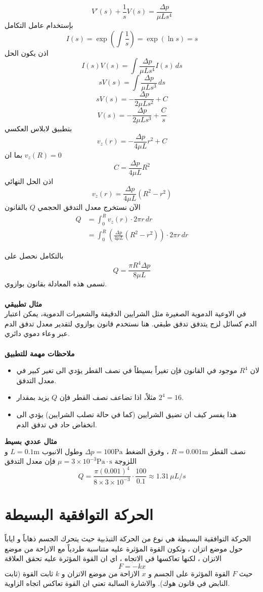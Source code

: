 \[
V'(s) + \frac{1}{s} V(s) = \frac{\Delta p}{\mu L s^4}
\]
بإستخدام عامل التكامل 
\[
I(s) = \exp\left(\int \frac{1}{s}\right) = \exp(\ln s) = s
\]
اذن يكون الحل
\[
I(s) V(s) = \int  \frac{\Delta p}{\mu L s^4} I(s)\, ds
\]
\[
s V(s) = \int \frac{\Delta p}{\mu L s^3} \, ds
\]
\[
s V(s) = -\frac{\Delta p}{2\mu L s^2} + C
\]
\[
V(s) = -\frac{\Delta p}{2\mu L s^3} + \frac{C}{s}
\]
بتطبيق لابلاس العكسي
\[
v_z(r) = - \frac{\Delta p}{4\mu L } r^2 + C
\]
بما ان $v_z(R) = 0 $
\[
C = \frac{\Delta p}{4\mu L } R^2
\]
اذن الحل النهائي
\[
v_z(r) = \frac{\Delta p}{4\mu L } (R^2 - r^2)
\]
الآن نستخرج معدل التدفق الحجمي $Q$ بالقانون
\begin{align*}
	Q &= \int_0^R v_z(r) \cdot 2\pi r \, dr\\
	&= \int_{0}^{R} \left(\frac{\Delta p}{4\mu L } (R^2 - r^2)\right)\cdot 2\pi r\, dr
\end{align*}

بالتكامل نحصل على 
\[
Q = \frac{\pi R^4 \Delta p}{8 \mu L}
\]
تسمى هذه المعادلة بقانون بوازوي.\\ \\
\noindent
\textbf{مثال تطبيقي}\\
\noindent
في الاوعية الدموية الصغيرة مثل الشرايين الدقيقة والشعيرات الدموية، يمكن اعتبار الدم كسائل لزج يتدفق تدفق طبقي. هنا نستخدم قانون بوازوي لتقدير معدل تدفق الدم عبر وعاء دموي دائري.\\ \\
\noindent
\textbf{ملاحظات مهمة للتطبيق}
\begin{itemize}
	\item لان $R^4$ موجود في القانون فإن تغيراً بسيطاً في نصف القطر يؤدي الى تغير كبير في معدل التدفق.
	\item مثلاً، اذا تضاعف نصف القطر فإن $Q$ يزيد بمقدار $2^4 = 16$.
	\item  هذا يفسر كيف ان تضيق الشرايين (كما في حالة تصلب الشرايين) يؤدي الى انخفاض حاد في تدفق الدم.
\end{itemize}
\noindent
\textbf{مثال عددي بسيط}\\
نصف القطر $R = 0.001 \text{m}$ ، وفرق الضغط $\Delta p = 100 \text{Pa}$ وطول الانبوب $L = 0.1 \text{m}$ و اللزوجة $\mu = 3 \times 10^{-3} \text{Pa}\cdot \text{s}$ فإن معدل التدفق
\[
Q = \frac{\pi (0.001)^4}{8\times 3\times10^{-3}} \cdot \frac{100}{0.1} \approx 1.31 \, \mu L/s
\]

\section{الحركة التوافقية البسيطة }
الحركة التوافقية البسيطة هي نوع من الحركة التبذبية حيث يتحرك الجسم ذهاباً و اياباً حول موضع اتزان ، وتكون القوة المؤثرة عليه متناسبة طردياً مع الازاحة من موضع الاتزان ، لكنها تعاكسها في الاتجاه ، اي  ان القوة المؤثرة عليه تحقق العلاقة 
\[
F = - k x
\]
حيث $F$ القوة المؤثرة على الجسم و $x$ الازاحة من موضع الاتزان و $k$ ثابت القوة (ثابت النابض في قانون هوك). والاشارة السالبة تعني ان القوة تعاكس اتجاه الزاوية.

